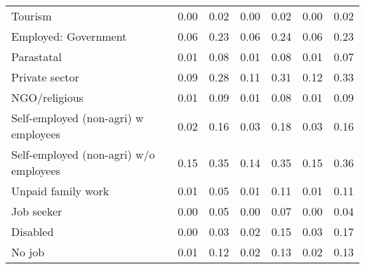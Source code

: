 \begin{table}[htbp]
\begin{tabulary}{1\textwidth}{Lcccccc}
     Tourism & 0.00  & 0.02  & 0.00  & 0.02  & 0.00  & 0.02 \\
     Employed: Government & 0.06  & 0.23  & 0.06  & 0.24  & 0.06  & 0.23 \\
     Parastatal & 0.01  & 0.08  & 0.01  & 0.08  & 0.01  & 0.07 \\
     Private sector & 0.09  & 0.28  & 0.11  & 0.31  & 0.12  & 0.33 \\
     NGO/religious & 0.01  & 0.09  & 0.01  & 0.08  & 0.01  & 0.09 \\
     Self-employed (non-agri) w employees & 0.02  & 0.16  & 0.03  & 0.18  & 0.03  & 0.16 \\
     Self-employed (non-agri) w/o employees & 0.15  & 0.35  & 0.14  & 0.35  & 0.15  & 0.36 \\
     Unpaid family work & 0.01  & 0.05  & 0.01  & 0.11  & 0.01  & 0.11 \\
     
     Job seeker & 0.00  & 0.05  & 0.00  & 0.07  & 0.00  & 0.04 \\
    
     Disabled  & 0.00  & 0.03  & 0.02  & 0.15  & 0.03  & 0.17 \\
     No job & 0.01  & 0.12  & 0.02  & 0.13  & 0.02  & 0.13 \\
    \bottomrule
    \end{tabulary}%
        
  \label{tab:addlabel}%
\end{table}%
 

